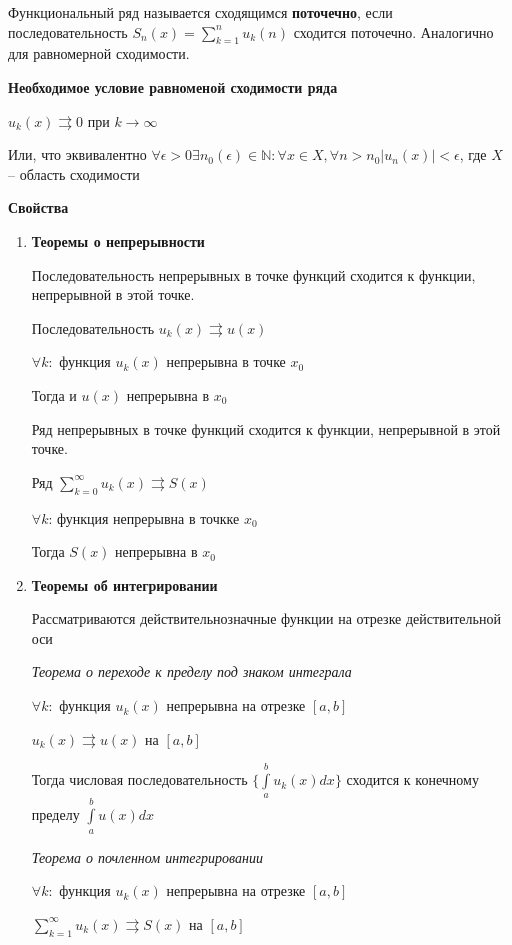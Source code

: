 \documentclass{article}
\begin{document}
Функциональный ряд называется сходящимся {\bf поточечно}, если последовательность $S_n(x) = \sum\limits_{k=1}^{n} u_k(n)$ сходится поточечно. Аналогично для равномерной сходимости.

{\bf Необходимое условие равноменой сходимости ряда}

$u_k(x) \rightrightarrows 0$ при $k \rightarrow \infty$

Или, что эквивалентно $\forall \epsilon > 0 \exists n_0(\epsilon) \in \mathbb{N} : \forall x \in X, \forall n > n_0 |u_n(x)| < \epsilon$, где $X$ -- область сходимости

{\bf Свойства}

\begin{enumerate}
	\item {\bf Теоремы о непрерывности}
	
	Последовательность непрерывных в точке функций сходится к функции, непрерывной в этой точке.
	
	Последовательность $u_k(x) \rightrightarrows u(x)$
	
	$\forall k:$ функция $u_k(x)$ непрерывна в точке $x_0$
	
	Тогда и $u(x)$ непрерывна в $x_0$
	
	Ряд непрерывных в точке функций сходится к функции, непрерывной в этой точке.
	
	Ряд $\sum\limits_{k=0}^{\infty}u_k(x) \rightrightarrows S(x)$
	
	$\forall k$: функция непрерывна в точкке $x_0$
	
	Тогда $S(x)$ непрерывна в  $x_0$
	
	\item {\bf Теоремы об интегрировании}
	
	Рассматриваются действительнозначные функции на отрезке действительной оси
	
	{\it Теорема о переходе к пределу под знаком интеграла}
	
	$\forall k:$ функция $u_k(x)$ непрерывна на отрезке $[a, b]$
	
	$u_k(x) \rightrightarrows u(x)$ на $[a, b]$
	
	Тогда числовая последовательность $\{\int\limits_{a}^{b} u_k(x) dx\}$ сходится к конечному пределу $\int\limits_a^b u(x) dx$
	
	{\it Теорема о почленном интегрировании}
	
	$\forall k:$ функция $u_k(x)$ непрерывна на отрезке $[a, b]$
	
	$\sum\limits_{k=1}^{\infty}u_k(x) \rightrightarrows S(x)$ на $[a, b]$
	

\end{enumerate}
\end{document}
